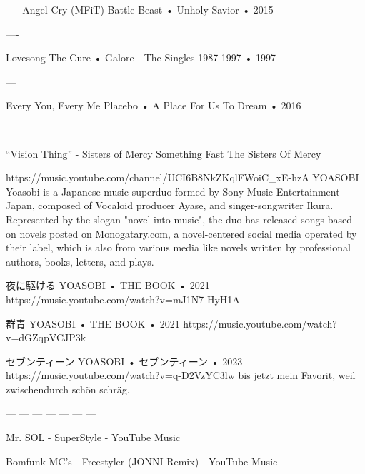 —-
Angel Cry (MFiT)
Battle Beast
 •
Unholy Savior
 •
2015








—-






Lovesong
The Cure
 •
Galore - The Singles 1987-1997
 •
1997




—


Every You, Every Me
Placebo
 •
A Place For Us To Dream
 •
2016




—














“Vision Thing” - Sisters of Mercy
Something Fast
The Sisters Of Mercy















https://music.youtube.com/channel/UCI6B8NkZKqlFWoiC_xE-hzA
YOASOBI
Yoasobi is a Japanese music superduo formed by Sony Music Entertainment Japan, composed of Vocaloid producer Ayase, and singer-songwriter Ikura. Represented by the slogan "novel into music", the duo has released songs based on novels posted on Monogatary.com, a novel-centered social media operated by their label, which is also from various media like novels written by professional authors, books, letters, and plays.


夜に駆ける
YOASOBI  •  THE BOOK  •  2021
https://music.youtube.com/watch?v=mJ1N7-HyH1A


群青
YOASOBI  •  THE BOOK  •  2021
https://music.youtube.com/watch?v=dGZqpVCJP3k


セブンティーン
YOASOBI  •  セブンティーン  •  2023
https://music.youtube.com/watch?v=q-D2VzYC3lw
bis jetzt mein Favorit, weil zwischendurch schön schräg.






— — — — — — —


Mr. SOL - SuperStyle - YouTube Music

Bomfunk MC's - Freestyler (JONNI Remix) - YouTube Music

